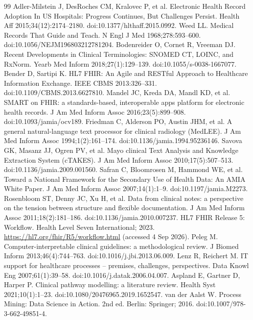 \documentclass[3p,twocolumn]{elsarticle}
\begin{document}
\begin{thebibliography}{99}
\label{r14} Adler-Milstein J, DesRoches CM, Kralovec P, et al. Electronic Health Record Adoption In US Hospitals: Progress Continues, But Challenges Persist. Health Aff 2015;34(12):2174--2180. doi:10.1377/hlthaff.2015.0992.
\label{r15} Weed LL. Medical Records That Guide and Teach. N Engl J Med 1968;278:593--600. doi:10.1056/NEJM196803212781204.
\label{r16} Bodenreider O, Cornet R, Vreeman DJ. Recent Developments in Clinical Terminologies: SNOMED CT, LOINC, and RxNorm. Yearb Med Inform 2018;27(1):129--139. doi:10.1055/s-0038-1667077.
\label{r17} Bender D, Sartipi K. HL7 FHIR: An Agile and RESTful Approach to Healthcare Information Exchange. IEEE CBMS 2013:326--331. doi:10.1109/CBMS.2013.6627810.
\label{r18} Mandel JC, Kreda DA, Mandl KD, et al. SMART on FHIR: a standards-based, interoperable apps platform for electronic health records. J Am Med Inform Assoc 2016;23(5):899--908. doi:10.1093/jamia/ocv189.
\label{r19} Friedman C, Alderson PO, Austin JHM, et al. A general natural-language text processor for clinical radiology (MedLEE). J Am Med Inform Assoc 1994;1(2):161--174. doi:10.1136/jamia.1994.95236146.
\label{r20} Savova GK, Masanz JJ, Ogren PV, et al. Mayo clinical Text Analysis and Knowledge Extraction System (cTAKES). J Am Med Inform Assoc 2010;17(5):507--513. doi:10.1136/jamia.2009.001560.
\label{r21} Safran C, Bloomrosen M, Hammond WE, et al. Toward a National Framework for the Secondary Use of Health Data: An AMIA White Paper. J Am Med Inform Assoc 2007;14(1):1--9. doi:10.1197/jamia.M2273.
\label{r22} Rosenbloom ST, Denny JC, Xu H, et al. Data from clinical notes: a perspective on the tension between structure and flexible documentation. J Am Med Inform Assoc 2011;18(2):181--186. doi:10.1136/jamia.2010.007237.
\label{r23} HL7 FHIR Release 5: Workflow. Health Level Seven International; 2023. \url{https://hl7.org/fhir/R5/workflow.html} (accessed 4 Sep 2026).
\label{r24} Peleg M. Computer-interpretable clinical guidelines: a methodological review. J Biomed Inform 2013;46(4):744--763. doi:10.1016/j.jbi.2013.06.009.
\label{r25} Lenz R, Reichert M. IT support for healthcare processes -- premises, challenges, perspectives. Data Knowl Eng 2007;61(1):39--58. doi:10.1016/j.datak.2006.04.007.
\label{r26} Aspland E, Gartner D, Harper P. Clinical pathway modelling: a literature review. Health Syst 2021;10(1):1--23. doi:10.1080/20476965.2019.1652547.
\label{r27} van der Aalst W. Process Mining: Data Science in Action. 2nd ed. Berlin: Springer; 2016. doi:10.1007/978-3-662-49851-4.

\end{thebibliography}
\end{document}
